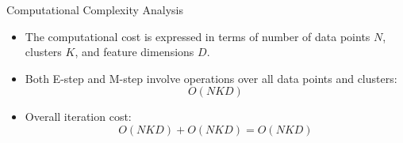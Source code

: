 \begin{frame}{Computational Complexity Analysis}
    \centering
    \begin{itemize}
        \item The computational cost is expressed in terms of number of data points $N$, clusters $K$, and feature dimensions $D$.
        \item Both E-step and M-step involve operations over all data points and clusters:
        \[O(NKD)\]
        \item Overall iteration cost:
        \[O(NKD) + O(NKD) = O(NKD)\]
    \end{itemize}
\end{frame}